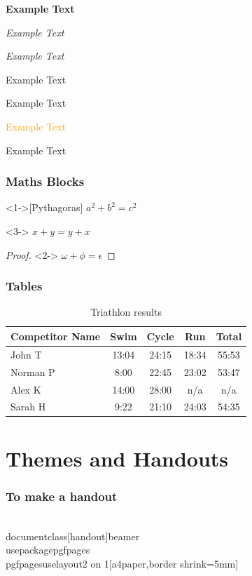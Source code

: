 \documentclass[14pt]{beamer}
\begin{document}
\begin{frame}
\textbf<2>{Example Text}

\textit<2>{Example Text}

\textsl<2>{Example Text}

\textrm<2>{Example Text}

\textsf<2>{Example Text}

\textcolor<2>{orange}{Example Text}

\alert<2>{Example Text}

\end{frame}

\begin{frame}
\frametitle{Maths Blocks}
\begin{theorem}<1->[Pythagoras]
	$ a^2 + b^2 = c^2$
\end{theorem}
\begin{corollary}<3->
	$ x + y = y + x  $
\end{corollary}
\begin{proof}<2->
	$\omega +\phi = \epsilon $
\end{proof}
\end{frame}

\begin{frame}
\frametitle{Tables}
\begin{table}
	\begin{tabular}{l | c | c | c | c }
		Competitor Name & Swim & Cycle & Run & Total \\
		\hline \hline
		John T & 13:04 & 24:15 & 18:34 & 55:53 \onslide<2-> \\
		Norman P & 8:00 & 22:45 & 23:02 & 53:47 \onslide<3->\\
		Alex K & 14:00 & 28:00 & n/a & n/a \onslide<4->\\
		Sarah H & 9:22 & 21:10 & 24:03 & 54:35
	\end{tabular}
	\caption{Triathlon results}
\end{table}
\end{frame}


\section{Themes and Handouts}

\begin{frame}[fragile]
\frametitle{To make a handout}
\begin{semiverbatim}
	\\documentclass[handout]{beamer}
	\\usepackage{pgfpages}
	\\pgfpagesuselayout{2 on 1}[a4paper,border shrink=5mm]
\end{semiverbatim}
\end{frame}
\end{document}
